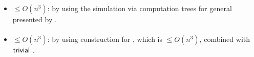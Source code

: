 \paragraph{\OMODLA{}\tto\TDFA}\label{cost:OM1DLAto2DFAu}
\begin{itemize}
	\item $\le O(n^3)$: by using the simulation via computation trees for general \OMODLAs presented by .
\end{itemize}
\paragraph{\OMODLA{}\tto\TNFA}
\begin{itemize}
	\item $\le O(n^3)$: by using construction for \hyperref[cost:OM1DLAto2DFAu]{\OMODLA{}\tto\TDFA}, which is $\le O(n^3)$, combined with $\mathsf{trivial}$ \TDFA{}\tto\TNFA.
\end{itemize}
